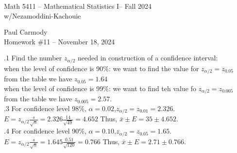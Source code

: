 \documentclass[10pt,a4paper]{report}
\newcommand{\CLASSNAME}{Math 5411 -- Mathematical Statistics I}
\newcommand{\PROFESSOR}{Nezamoddini-Kachouie}
\newcommand{\STUDENTNAME}{Paul Carmody}
\newcommand{\ASSIGNMENT}{Homework \#11 }
\newcommand{\DUEDATE}{November 18, 2024}
\newcommand{\SEMESTER}{Fall 2024}
\begin{document}
\begin{center}
	\Large{\CLASSNAME -- \SEMESTER} \\
	\large{w/\PROFESSOR}
\end{center}
\begin{center}
	\STUDENTNAME \\
	\ASSIGNMENT -- \DUEDATE\\
\end{center}

.1 Find the number $ z_{\alpha/2}$
  needed in construction of a confidence interval:\\

when the level of confidence is  90\%: we want to find the value for $z_{\alpha/2} = z_{0.05}$ from the table we have $z_{0.05} = 1.64$\\

when the level of confidence is  99\%: we want to find teh value fo $z_{\alpha/2} = z_{0.005}$ from the table we have $z_{0.005} = 2.57$.\\

.3  For confidence level  98\%,  $\alpha=0.02$,$z_{\alpha/2}=z_{0.01}=2.326$.  $E=z_{\alpha/2}\frac{s}{\sqrt{n}} = 2.326\frac{14}{\sqrt{49}}=4.652$  Thus, $\bar{x}\pm E = 35 \pm 4.652$.\\

.4  For confidence level  90\%,  $\alpha=0.10$,$z_{\alpha/2}=z_{0.05}=1.65$.  $E=z_{\alpha/2}\frac{s}{\sqrt{n}} = 1.645\frac{0.51}{\sqrt{120}}=0.766$   Thus, $\bar{x}\pm E = 2.71 \pm 0.766$.\\
\end{document}
